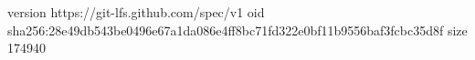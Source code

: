 version https://git-lfs.github.com/spec/v1
oid sha256:28e49db543be0496e67a1da086e4ff8bc71fd322e0bf11b9556baf3fcbc35d8f
size 174940
